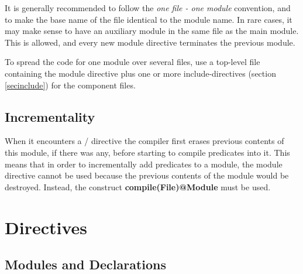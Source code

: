It is generally recommended to follow the {\em one file - one module}
convention, and to make the base name of the file identical to the
module name.  In rare cases, it may make sense to have an auxiliary
module in the same file as the main module.  This is allowed, and
every new module directive terminates the previous module.

To spread the code for one module over several files, use a top-level
file containing the module directive plus one or more include-directives
(section \ref{secinclude}) for the component files.


\subsection{Incrementality}

When it encounters a
/
 directive
the compiler first erases previous contents of this module,
if there was any, before starting to compile predicates
into it.  This means that in order to incrementally add predicates
to a module, the module directive cannot be used
because the previous contents of the module would be destroyed.
Instead, the construct {\bf compile(File)@Module} must be used.




\section{Directives}

\subsection{Modules and Declarations}

